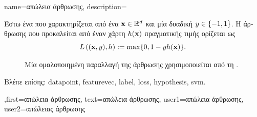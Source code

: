 {name={\foreignlanguage{greek}{απώλεια άρθρωσης}}, 
	description={\foreignlanguage{greek}{Έστω ένα}  
		\foreignlanguage{greek}{που χαρακτηρίζεται από ένα}  ${\bf x} \in \mathbb{R}^{d}$ 
		\foreignlanguage{greek}{και μία δυαδική}  $y \in \{-1,1\}$. \foreignlanguage{greek}{Η}  
		\foreignlanguage{greek}{άρθρωσης που προκαλείται από έναν χάρτη}  $h({\bf x})$ 
		\foreignlanguage{greek}{πραγματικής τιμής ορίζεται ως} 
		\begin{equation} 
			\label{equ_hinge_loss_gls_dict}
				L\left(({\bf x},y),h \right) := \max \{ 0 , 1 - y h({\bf x}) \}. 
			\end{equation}
\begin{figure}[H]
\begin{center}
{
\caption{\foreignlanguage{greek}{Μία ομαλοποιημένη παραλλαγή της}  \foreignlanguage{greek}{άρθρωσης 
	    χρησιμοποιείται από τη}  \cite{LampertNowKernel}.}
\label{fig_hingeloss}}
\end{center}
\end{figure} 
	    \foreignlanguage{greek}{Βλέπε επίσης:} \gls{datapoint}, \gls{featurevec}, \gls{label}, \gls{loss}, \gls{hypothesis}, \gls{svm}.
		},first={\foreignlanguage{greek}{απώλεια άρθρωσης}},
		text={\foreignlanguage{greek}{απώλεια άρθρωσης}},
		user1={\foreignlanguage{greek}{απώλεια άρθρωσης}}, %
		user2={\foreignlanguage{greek}{απώλειας άρθρωσης}} %
}

